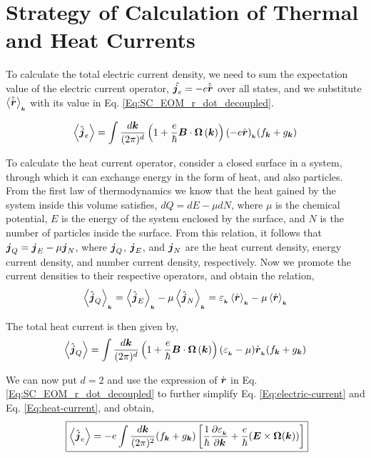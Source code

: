 \documentclass{report}
\renewcommand\vec[1]{\ensuremath\boldsymbol{#1}} %
\begin{document}
\chapter{Strategy of Calculation of Thermal and Heat Currents}
To calculate the total electric current density, we need to sum the expectation value of the electric current operator, $\hat{\vec{j}_e} = -e \hat{\dot{\vec{r}}}$ over all states, and we substitute $\expval{\hat{\dot{\vec{r}}}}_{_{\vec{k}}}$ with its value in Eq. \eqref{Eq:SC_EOM_r_dot_decoupled}.

\begin{equation} \label{Eq:electric-current}
	\expval{\hat{\vec{j}}_e} = \int \frac{d\vec{k}}{(2\pi)^d} \left(1 + \frac{e}{\hbar} \vec{B} \cdot  \vec{\Omega}\left(\vec{k}\right)\right) (- e \dot{\vec{r}})_{_{\vec{k}}} ({f}_{\vec{k}} + {g}_{\vec{k}})
\end{equation}

To calculate the heat current operator, consider a closed surface in a system, through which it can exchange energy in the form of heat, and also particles. From the first law of thermodynamics we know that the heat gained by the system inside this volume satisfies, $dQ = dE - \mu dN$, where $\mu$ is the chemical potential, $E$ is the energy of the system enclosed by the surface, and $N$ is the number of particles inside the surface. From this relation, it follows that $\vec{j}_Q = \vec{j}_E - \mu \vec{j}_N$, where $\vec{j}_Q$, $\vec{j}_E$, and $\vec{j}_N$ are the heat current density, energy current density, and number current density, respectively. Now we promote the current densities to their respective operators, and obtain the relation,
\begin{equation} 
	\expval{\hat{\vec{j}}_Q}_{_{\vec{k}}} = \expval{\hat{\vec{j}}_E}_{_{\vec{k}}} - \mu \expval{\hat{\vec{j}}_N}_{_{\vec{k}}} = \varepsilon_{_{\vec{k}}} \expval{\dot{\vec{r}}}_{_{\vec{k}}} - \mu \expval{\dot{\vec{r}}}_{_{\vec{k}}}
\end{equation}

The total heat current is then given by,
\begin{equation} \label{Eq:heat-current}
	\expval{\hat{\vec{j}}_Q} = \int \frac{d\vec{k}}{(2\pi)^d} \left(1 + \frac{e}{\hbar} \vec{B} \cdot  \vec{\Omega}\left(\vec{k}\right)\right) (\varepsilon_{_{\vec{k}}} - \mu) \dot{\vec{r}}_{_{\vec{k}}} ({f}_{\vec{k}} + {g}_{\vec{k}})
\end{equation}

We can now put $d = 2$ and use the expression of $\dot{\vec{r}}$ in Eq. \eqref{Eq:SC_EOM_r_dot_decoupled} to further simplify Eq. \eqref{Eq:electric-current} and Eq. \eqref{Eq:heat-current}, and obtain,
\begin{equation}~\label{Eq:electric-current-simplified}
	\boxed{\expval{\hat{\vec{j}}_e} = -e \int \frac{d\vec{k}}{(2\pi)^2} ({f}_{\vec{k}} + {g}_{\vec{k}}) \left[\frac{1}{\hbar} \frac{\partial \varepsilon_{_{\vec{k}}}}{\partial \vec{k}} + \frac{e}{\hbar} (\vec{E}\times\vec{\Omega}(\vec{k}))\right]}
\end{equation}
\end{document}
